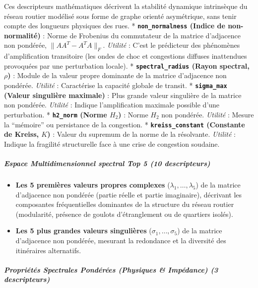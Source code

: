 \documentclass[10pt, a4paper]{article}
\providecommand{\tightlist}{}
\begin{document}
Ces descripteurs mathématiques décrivent la stabilité dynamique
intrinsèque du réseau routier modélisé sous forme de graphe orienté
asymétrique, sans tenir compte des longueurs physiques des rues. *
\textbf{\texttt{non\_normalness} (Indice de non-normalité)} : Norme de
Frobenius du commutateur de la matrice d'adjacence non pondérée,
\(\|AA^T - A^TA\|_F\). \emph{Utilité} : C'est le prédicteur des
phénomènes d'amplification transitoire (les ondes de choc et congestions
diffuses inattendues provoquées par une perturbation locale). *
\textbf{\texttt{spectral\_radius} (Rayon spectral, \(\rho\))} : Module
de la valeur propre dominante de la matrice d'adjacence non pondérée.
\emph{Utilité} : Caractérise la capacité globale de transit. *
\textbf{\texttt{sigma\_max} (Valeur singulière maximale)} : Plus grande
valeur singulière de la matrice non pondérée. \emph{Utilité} : Indique
l'amplification maximale possible d'une perturbation. *
\textbf{\texttt{h2\_norm} (Norme \(H_2\))} : Norme \(H_2\) non pondérée.
\emph{Utilité} : Mesure la ``mémoire'' ou persistance de la congestion.
* \textbf{\texttt{kreiss\_constant} (Constante de Kreiss, \(K\))} :
Valeur du supremum de la norme de la résolvante. \emph{Utilité} :
Indique la fragilité structurelle face à une crise de congestion
soudaine.

\subparagraph{Espace Multidimensionnel spectral Top 5 (10
descripteurs)}\label{espace-multidimensionnel-spectral-top-5-10-descripteurs}

\begin{itemize}
\tightlist
\item
  \textbf{Les 5 premières valeurs propres complexes}
  (\(\lambda_1, \dots, \lambda_5\)) de la matrice d'adjacence non
  pondérée (partie réelle et partie imaginaire), décrivant les
  composantes fréquentielles dominantes de la structure du réseau
  routier (modularité, présence de goulots d'étranglement ou de
  quartiers isolés).
\item
  \textbf{Les 5 plus grandes valeurs singulières}
  (\(\sigma_1, \dots, \sigma_5\)) de la matrice d'adjacence non
  pondérée, mesurant la redondance et la diversité des itinéraires
  alternatifs.
\end{itemize}

\subparagraph{Propriétés Spectrales Pondérées (Physiques \& Impédance)
(3
descripteurs)}\label{propriuxe9tuxe9s-spectrales-ponduxe9ruxe9es-physiques-impuxe9dance-3-descripteurs}
\end{document}
